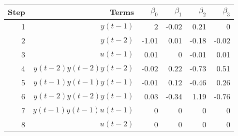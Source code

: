 \begin{tabular}{rrrrrr}
Step & Terms & $\beta_{0}$ & $\beta_{1}$ & $\beta_{2}$ & $\beta_{3}$ \\ 
\hline 
1 & $y(t-1)$ & 2 & -0.02 & 0.21 & 0 \\ 
2 & $y(t-2)$ & -1.01 & 0.01 & -0.18 & -0.02 \\ 
3 & $u(t-1)$ & 0.01 & 0 & -0.01 & 0.01 \\ 
4 & $y(t-2)y(t-2)y(t-2)$ & -0.02 & 0.22 & -0.73 & 0.51 \\ 
5 & $y(t-1)y(t-1)y(t-1)$ & -0.01 & 0.12 & -0.46 & 0.26 \\ 
6 & $y(t-2)y(t-2)y(t-1)$ & 0.03 & -0.34 & 1.19 & -0.76 \\ 
7 & $y(t-1)y(t-1)u(t-1)$ & 0 & 0 & 0 & 0 \\ 
8 & $u(t-2)$ & 0 & 0 & 0 & 0 \\ 
\hline 
\end{tabular}